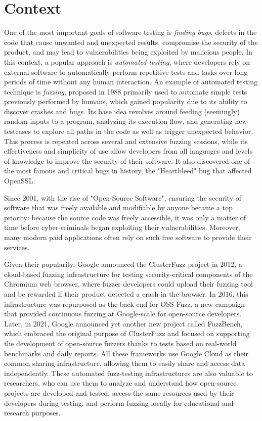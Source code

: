 \section{Context}
One of the most important goals of software testing is \textit{finding bugs}, defects in the code that cause unwanted and unexpected results, compromise the security of the product, and may lead to vulnerabilities being exploited by malicious people. In this context, a popular approach is \textit{automated testing}, where developers rely on external software to automatically perform repetitive tests and tasks over long periods of time without any human interaction. An example of automated testing technique is \textit{fuzzing}, proposed in 1988 \cite{fuzz_proposed} primarily used to automate simple tests previously performed by humans, which gained popularity due to its ability to discover crashes and bugs. Its base idea revolves around feeding (seemingly) random inputs to a program, analyzing its execution flow, and generating new testcases to explore all paths in the code as well as trigger unexpected behavior. This process is repeated across several and extensive fuzzing sessions, while its effectiveness and simplicity of use allow developers from all languages and levels of knowledge to improve the security of their software. It also discovered one of the most famous and critical bugs in history, the "Heartbleed" bug that affected OpenSSL.

Since 2001, with the rise of "Open-Source Software", ensuring the security of software that was freely available and modifiable by anyone became a top priority: because the source code was freely accessible, it was only a matter of time before cyber-criminals began exploiting their vulnerabilities. Moreover, many modern paid applications often rely on such free software to provide their services. 

Given their popularity, Google announced the ClusterFuzz project in 2012, a cloud-based fuzzing infrastructure for testing security-critical components of the Chromium web browser, where fuzzer developers could upload their fuzzing tool and be rewarded if their product detected a crash in the browser. In 2016, this infrastructure was repurposed as the back-end for OSS-Fuzz, a new campaign that provided continuous fuzzing at Google-scale for open-source developers. Later, in 2021, Google announced yet another new project called FuzzBench, which embraced the original purpose of ClusterFuzz and focused on supporting the development of open-source fuzzers thanks to tests based on real-world benchmarks and daily reports. All these frameworks use Google Cloud as their common sharing infrastructure, allowing them to easily share and access data independently. These automated fuzz-testing infrastructures are also valuable to researchers, who can use them to analyze and understand how open-source projects are developed and tested, access the same resources used by their developers during testing, and perform fuzzing locally for educational and research purposes.

